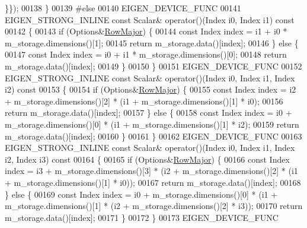 \begin{DoxyCode}
      \}\});
00138     \}
00139 \textcolor{preprocessor}{#else}
00140     EIGEN\_DEVICE\_FUNC
00141     EIGEN\_STRONG\_INLINE \textcolor{keyword}{const} Scalar& operator()(Index i0, Index i1)\textcolor{keyword}{ const}
00142 \textcolor{keyword}{    }\{
00143       \textcolor{keywordflow}{if} (Options&\hyperlink{group__enums_ggaacded1a18ae58b0f554751f6cdf9eb13acfcde9cd8677c5f7caf6bd603666aae3}{RowMajor}) \{
00144         \textcolor{keyword}{const} Index index = i1 + i0 * m\_storage.dimensions()[1];
00145         \textcolor{keywordflow}{return} m\_storage.data()[index];
00146       \} \textcolor{keywordflow}{else} \{
00147         \textcolor{keyword}{const} Index index = i0 + i1 * m\_storage.dimensions()[0];
00148         \textcolor{keywordflow}{return} m\_storage.data()[index];
00149       \}
00150     \}
00151     EIGEN\_DEVICE\_FUNC
00152     EIGEN\_STRONG\_INLINE \textcolor{keyword}{const} Scalar& operator()(Index i0, Index i1, Index i2)\textcolor{keyword}{ const}
00153 \textcolor{keyword}{    }\{
00154       \textcolor{keywordflow}{if} (Options&\hyperlink{group__enums_ggaacded1a18ae58b0f554751f6cdf9eb13acfcde9cd8677c5f7caf6bd603666aae3}{RowMajor}) \{
00155          \textcolor{keyword}{const} Index index = i2 + m\_storage.dimensions()[2] * (i1 + m\_storage.dimensions()[1] * i0);
00156          \textcolor{keywordflow}{return} m\_storage.data()[index];
00157       \} \textcolor{keywordflow}{else} \{
00158          \textcolor{keyword}{const} Index index = i0 + m\_storage.dimensions()[0] * (i1 + m\_storage.dimensions()[1] * i2);
00159         \textcolor{keywordflow}{return} m\_storage.data()[index];
00160       \}
00161     \}
00162     EIGEN\_DEVICE\_FUNC
00163     EIGEN\_STRONG\_INLINE \textcolor{keyword}{const} Scalar& operator()(Index i0, Index i1, Index i2, Index i3)\textcolor{keyword}{ const}
00164 \textcolor{keyword}{    }\{
00165       \textcolor{keywordflow}{if} (Options&\hyperlink{group__enums_ggaacded1a18ae58b0f554751f6cdf9eb13acfcde9cd8677c5f7caf6bd603666aae3}{RowMajor}) \{
00166         \textcolor{keyword}{const} Index index = i3 + m\_storage.dimensions()[3] * (i2 + m\_storage.dimensions()[2] * (i1 + 
      m\_storage.dimensions()[1] * i0));
00167         \textcolor{keywordflow}{return} m\_storage.data()[index];
00168       \} \textcolor{keywordflow}{else} \{
00169         \textcolor{keyword}{const} Index index = i0 + m\_storage.dimensions()[0] * (i1 + m\_storage.dimensions()[1] * (i2 + 
      m\_storage.dimensions()[2] * i3));
00170         \textcolor{keywordflow}{return} m\_storage.data()[index];
00171       \}
00172     \}
00173     EIGEN\_DEVICE\_FUNC

\end{DoxyCode}

